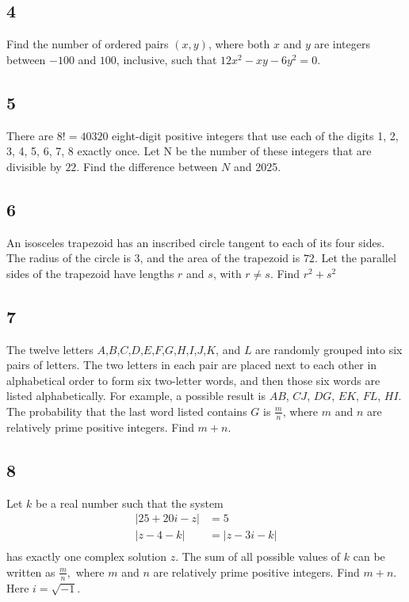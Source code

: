 \subsection{4}
Find the number of ordered pairs $(x,y)$, where both $x$ and $y$ are integers between $-100$ and $100$, inclusive, such that $12x^2-xy-6y^2=0$.

\subsection{5}
There are $8!= 40320$ eight-digit positive integers that use each of the digits 1, 2, 3, 4, 5, 6, 7, 8 exactly once. Let N be the number of these integers that are divisible by $22$. Find the difference between $N$ and 2025.

\subsection{6}
An isosceles trapezoid has an inscribed circle tangent to each of its four sides. The radius of the circle is $3$, and the area of the trapezoid is $72$. Let the parallel sides of the trapezoid have lengths $r$ and $s$, with $r \neq s$. Find $r^2+s^2$

\subsection{7}
The twelve letters $A$,$B$,$C$,$D$,$E$,$F$,$G$,$H$,$I$,$J$,$K$, and $L$ are randomly grouped into six pairs of letters. The two letters in each pair are placed next to each other in alphabetical order to form six two-letter words, and then those six words are listed alphabetically. For example, a possible result is $AB$, $CJ$, $DG$, $EK$, $FL$, $HI$. The probability that the last word listed contains $G$ is $\frac mn$, where $m$ and $n$ are relatively prime positive integers. Find $m+n$.

\subsection{8}
Let $k$ be a real number such that the system
\begin{align*} |25+20i-z|&=5\\ |z-4-k|&=|z-3i-k| \\ \end{align*}
has exactly one complex solution $z$. The sum of all possible values of $k$ can be written as $\frac{m}{n},$ where $m$ and $n$ are relatively prime positive integers. Find $m+n.$ Here $i=\sqrt{-1}.$

